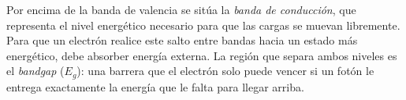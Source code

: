 
Por encima de la banda de valencia se sitúa la \emph{banda de conducción}, que representa el nivel energético necesario para que las cargas se muevan libremente. Para que un electrón realice este salto entre bandas hacia un estado más energético, debe absorber energía externa. La región que separa ambos niveles es el \emph{bandgap} ($E_g$): una barrera que el electrón solo puede vencer si un fotón le entrega exactamente la energía que le falta para llegar arriba.


